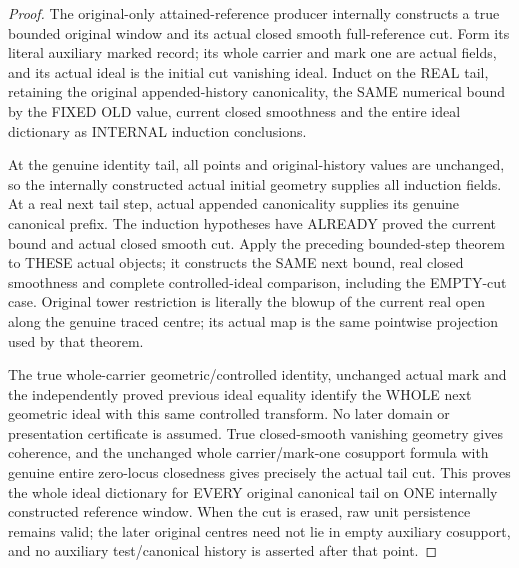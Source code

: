 \begin{proof}
The original-only attained-reference producer internally constructs a true
bounded original window and its actual closed smooth full-reference cut.
Form its literal auxiliary marked record; its whole carrier and mark one
are actual fields, and its actual ideal is the initial cut vanishing ideal.
Induct on the REAL tail, retaining the original appended-history canonicality,
the SAME numerical bound by the FIXED OLD value, current closed smoothness
and the entire ideal dictionary as INTERNAL induction conclusions.

At the genuine identity tail, all points and original-history values are
unchanged, so the internally constructed actual initial geometry supplies
all induction fields. At a real next tail step, actual appended canonicality
supplies its genuine canonical prefix. The induction hypotheses have ALREADY
proved the current bound and actual closed smooth cut. Apply the preceding
bounded-step theorem to THESE actual objects; it constructs the SAME next
bound, real closed smoothness and complete controlled-ideal comparison,
including the EMPTY-cut case. Original tower restriction is literally the
blowup of the current real open along the genuine traced centre; its actual
map is the same pointwise projection used by that theorem.

The true whole-carrier geometric/controlled identity, unchanged actual mark
and the independently proved previous ideal equality identify the WHOLE next
geometric ideal with this same controlled transform. No later domain or
presentation certificate is assumed. True closed-smooth vanishing geometry
gives coherence, and the unchanged whole carrier/mark-one cosupport formula
with genuine entire zero-locus closedness gives precisely the actual tail
cut. This proves the whole ideal dictionary for EVERY original canonical
tail on ONE internally constructed reference window. When the cut is erased,
raw unit persistence remains valid; the later original centres need not lie
in empty auxiliary cosupport, and no auxiliary test/canonical history is
asserted after that point.
\end{proof}

